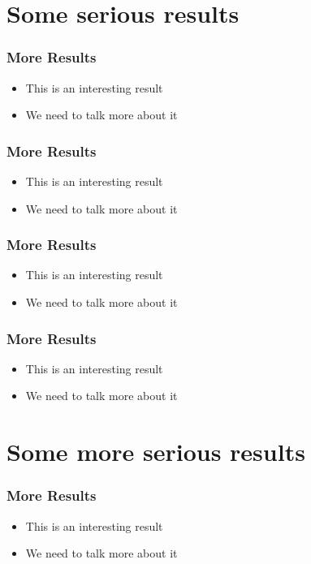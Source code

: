 \documentclass[10pt,xcolor=table]{beamer}
\begin{document}
\section{Some serious results}
\begin{frame}
  \frametitle{More Results}
  \begin{itemize}
  \item This is an interesting result
  \item We need to talk more about it
  \end{itemize}
\end{frame}

\begin{frame}
  \frametitle{More Results}
  \begin{itemize}
  \item This is an interesting result
  \item We need to talk more about it
  \end{itemize}
\end{frame}
\begin{frame}
  \frametitle{More Results}
  \begin{itemize}
  \item This is an interesting result
  \item We need to talk more about it
  \end{itemize}
\end{frame}
\begin{frame}
  \frametitle{More Results}
  \begin{itemize}
  \item This is an interesting result
  \item We need to talk more about it
  \end{itemize}
\end{frame}
\section{Some more serious results}
\begin{frame}
  \frametitle{More Results}
  \begin{itemize}
  \item This is an interesting result
  \item We need to talk more about it
  \end{itemize}
\end{frame}


\end{document}
